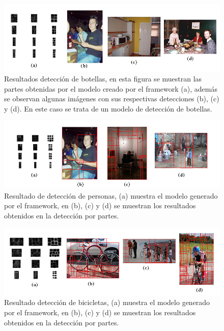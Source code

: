 \begin{figure}[tb]
\centering
 \includegraphics[width=1\textwidth]{Figuras/results/bottle_r/resultados.jpg}
 \caption[Detección de partes para un objeto (botellas)]{Resultados detección de botellas, en esta figura se muestran las partes obtenidas por el modelo creado por el framework (a), además se observan algunas imágenes con sus respectivas detecciones (b), (c) y (d). En este caso se trata de un modelo de detección de botellas.}
 \label{fig:botellas}
\end{figure}

\begin{figure}[tb]
\centering
 \includegraphics[width=1\textwidth]{Figuras/results/person_r/resultados.jpg}
 \caption[Detección de partes para un objeto (personas)]{Resultado de detección de personas, (a) muestra el modelo generado por el framework, en (b), (c) y (d) se muestran los resultados obtenidos en la detección por partes.}
 \label{fig:personas}
\end{figure}

\begin{figure}[tb]
\centering
 \includegraphics[width=1\textwidth]{Figuras/results/bicycle_r/resultados.jpg}
 \caption[Detección de partes para un objeto (bicicleta)]{Resultado detección de bicicletas, (a) muestra el modelo generado por el framework, en (b), (c) y (d) se muestran los resultados obtenidos en la detección por partes.}
 \label{fig:bicicleta}
\end{figure}

